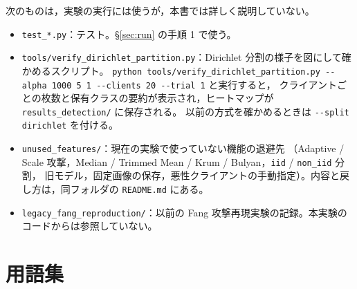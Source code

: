 \documentclass[a4j, dvipdfmx]{jsarticle}  %
\begin{document}
次のものは，実験の実行には使うが，本書では詳しく説明していない。

\begin{itemize}
  \item \texttt{test\_*.py}：テスト。\S\ref{sec:run} の手順 1 で使う。
  \item \texttt{tools/verify\_dirichlet\_partition.py}：Dirichlet 分割の様子を図にして確かめるスクリプト。
        \texttt{python tools/verify\_dirichlet\_partition.py -{}-alpha 1000 5 1 -{}-clients 20 -{}-trial 1} と実行すると，
        クライアントごとの枚数と保有クラスの要約が表示され，ヒートマップが \texttt{results\_detection/} に保存される。
        以前の方式を確かめるときは \texttt{-{}-split dirichlet} を付ける。
  \item \texttt{unused\_features/}：現在の実験で使っていない機能の退避先
        （Adaptive / Scale 攻撃，Median / Trimmed Mean / Krum / Bulyan，\texttt{iid} / \texttt{non\_iid} 分割，
        旧モデル，固定画像の保存，悪性クライアントの手動指定）。内容と戻し方は，同フォルダの \texttt{README.md} にある。
  \item \texttt{legacy\_fang\_reproduction/}：以前の Fang 攻撃再現実験の記録。本実験のコードからは参照していない。
\end{itemize}

\section{用語集}
\label{sec:glossary}
\end{document}
